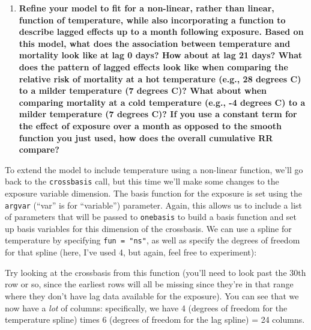 \documentclass[
]{book}
\newenvironment{Shaded}{\begin{snugshade}}{\end{snugshade}}
\newcommand{\AttributeTok}[1]{\textcolor[rgb]{0.77,0.63,0.00}{#1}}
\newcommand{\DecValTok}[1]{\textcolor[rgb]{0.00,0.00,0.81}{#1}}
\newcommand{\FunctionTok}[1]{\textcolor[rgb]{0.00,0.00,0.00}{#1}}
\newcommand{\NormalTok}[1]{#1}
\newcommand{\OtherTok}[1]{\textcolor[rgb]{0.56,0.35,0.01}{#1}}
\newcommand{\SpecialCharTok}[1]{\textcolor[rgb]{0.00,0.00,0.00}{#1}}
\newcommand{\StringTok}[1]{\textcolor[rgb]{0.31,0.60,0.02}{#1}}
\providecommand{\tightlist}{%
  \setlength{\itemsep}{0pt}\setlength{\parskip}{0pt}}
\begin{document}
\begin{enumerate}
\def\labelenumi{\arabic{enumi}.}
\setcounter{enumi}{2}
\tightlist
\item
  \textbf{Refine your model to fit for a non-linear, rather than linear, function
  of temperature, while also incorporating a function to describe lagged effects up
  to a month following exposure. Based on this model, what does the association
  between temperature and mortality look like at lag 0 days? How about at lag 21 days?
  What does the pattern of lagged effects look like when comparing the relative risk of
  mortality at a hot temperature (e.g., 28 degrees C) to a milder temperature
  (7 degrees C)? What about when comparing mortality at a cold temperature
  (e.g., -4 degrees C) to a milder temperature (7 degrees C)? If you use a constant
  term for the effect of exposure
  over a month as opposed to the smooth function you just used, how does the overall
  cumulative RR compare?}
\end{enumerate}

To extend the model to include temperature using a non-linear function, we'll go back
to the \texttt{crossbasis} call, but this time we'll make some changes to the exposure variable
dimension. The basis function for the exposure is set using the \texttt{argvar} (``var'' is
for ``variable'') parameter. Again, this allows us to include a list of parameters that
will be passed to \texttt{onebasis} to build a basis function and set up basis variables for
this dimension of the crossbasis. We can use a spline for temperature by specifying
\texttt{fun\ =\ "ns"}, as well as specify the degrees of freedom for that spline (here, I've used
4, but again, feel free to experiment):

\begin{Shaded}
\end{Shaded}

Try looking at the crossbasis from this function (you'll need to look past the 30th row
or so, since the earliest rows will all be missing since they're in that range where
they don't have lag data available for the exposure). You can see that we now have a
\emph{lot} of columns: specifically, we have 4 (degrees of freedom for the temperature spline)
times 6 (degrees of freedom for the lag spline) = 24 columns.
\end{document}
